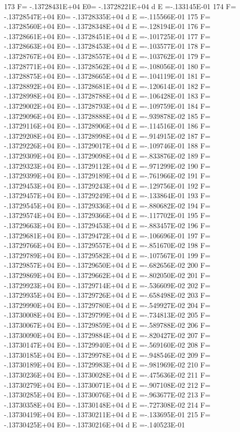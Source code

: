  173 F= -.13728431E+04 E0= -.13728221E+04  d E =-.133145E-01
 174 F= -.13728547E+04 E0= -.13728335E+04  d E =-.115566E-01
 175 F= -.13728560E+04 E0= -.13728348E+04  d E =-.128194E-01
 176 F= -.13728661E+04 E0= -.13728451E+04  d E =-.101725E-01
 177 F= -.13728663E+04 E0= -.13728453E+04  d E =-.103577E-01
 178 F= -.13728767E+04 E0= -.13728557E+04  d E =-.103762E-01
 179 F= -.13728771E+04 E0= -.13728562E+04  d E =-.108056E-01
 180 F= -.13728875E+04 E0= -.13728665E+04  d E =-.104119E-01
 181 F= -.13728892E+04 E0= -.13728681E+04  d E =-.120614E-01
 182 F= -.13728998E+04 E0= -.13728788E+04  d E =-.106428E-01
 183 F= -.13729002E+04 E0= -.13728793E+04  d E =-.109759E-01
 184 F= -.13729096E+04 E0= -.13728888E+04  d E =-.939878E-02
 185 F= -.13729116E+04 E0= -.13728906E+04  d E =-.114516E-01
 186 F= -.13729208E+04 E0= -.13728998E+04  d E =-.914915E-02
 187 F= -.13729226E+04 E0= -.13729017E+04  d E =-.109746E-01
 188 F= -.13729309E+04 E0= -.13729098E+04  d E =-.833876E-02
 189 F= -.13729323E+04 E0= -.13729112E+04  d E =-.971299E-02
 190 F= -.13729399E+04 E0= -.13729189E+04  d E =-.761966E-02
 191 F= -.13729453E+04 E0= -.13729243E+04  d E =-.129756E-01
 192 F= -.13729457E+04 E0= -.13729249E+04  d E =-.133864E-01
 193 F= -.13729545E+04 E0= -.13729336E+04  d E =-.880682E-02
 194 F= -.13729574E+04 E0= -.13729366E+04  d E =-.117702E-01
 195 F= -.13729663E+04 E0= -.13729453E+04  d E =-.883457E-02
 196 F= -.13729681E+04 E0= -.13729472E+04  d E =-.106696E-01
 197 F= -.13729766E+04 E0= -.13729557E+04  d E =-.851670E-02
 198 F= -.13729789E+04 E0= -.13729582E+04  d E =-.107567E-01
 199 F= -.13729857E+04 E0= -.13729650E+04  d E =-.682656E-02
 200 F= -.13729869E+04 E0= -.13729662E+04  d E =-.802050E-02
 201 F= -.13729923E+04 E0= -.13729714E+04  d E =-.536609E-02
 202 F= -.13729935E+04 E0= -.13729726E+04  d E =-.658498E-02
 203 F= -.13729990E+04 E0= -.13729780E+04  d E =-.549927E-02
 204 F= -.13730008E+04 E0= -.13729799E+04  d E =-.734813E-02
 205 F= -.13730067E+04 E0= -.13729859E+04  d E =-.589788E-02
 206 F= -.13730090E+04 E0= -.13729884E+04  d E =-.820427E-02
 207 F= -.13730147E+04 E0= -.13729940E+04  d E =-.569160E-02
 208 F= -.13730185E+04 E0= -.13729978E+04  d E =-.948546E-02
 209 F= -.13730189E+04 E0= -.13729983E+04  d E =-.981969E-02
 210 F= -.13730236E+04 E0= -.13730028E+04  d E =-.475636E-02
 211 F= -.13730279E+04 E0= -.13730071E+04  d E =-.907108E-02
 212 F= -.13730285E+04 E0= -.13730076E+04  d E =-.963677E-02
 213 F= -.13730358E+04 E0= -.13730148E+04  d E =-.727308E-02
 214 F= -.13730419E+04 E0= -.13730211E+04  d E =-.133695E-01
 215 F= -.13730425E+04 E0= -.13730216E+04  d E =-.140523E-01
